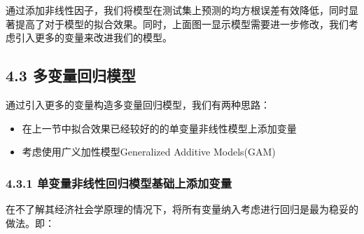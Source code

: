 \documentclass[UTF-8]{ctexart}
\begin{document}
\begin{figure}[htbp]
	\centering
\end{figure}

通过添加非线性因子，我们将模型在测试集上预测的均方根误差有效降低，同时显著提高了对于模型的拟合效果。同时，上面图一显示模型需要进一步修改，我们考虑引入更多的变量来改进我们的模型。

\subsection{4.3 多变量回归模型}
通过引入更多的变量构造多变量回归模型，我们有两种思路：
\begin{itemize}
	\item 在上一节中拟合效果已经较好的的单变量非线性模型上添加变量
	\item 考虑使用广义加性模型Generalized
	Additive Models(GAM)
\end{itemize}

\subsubsection{4.3.1 单变量非线性回归模型基础上添加变量}
在不了解其经济社会学原理的情况下，将所有变量纳入考虑进行回归是最为稳妥的做法。即：
\end{document}
